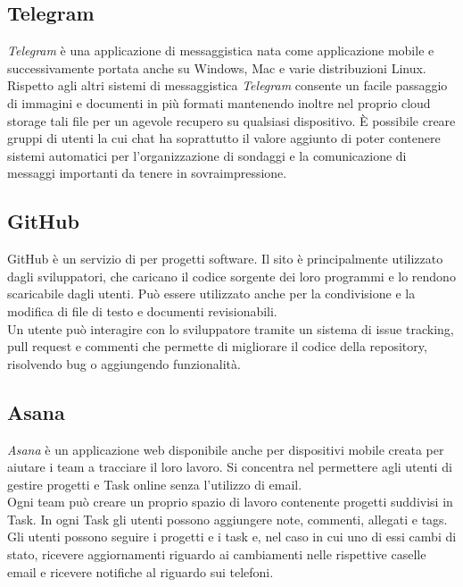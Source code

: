 \documentclass[./../NomeDocumento.tex]{subfiles}
\begin{document}
	\subsection{Telegram}
	
	\textit{Telegram} è una applicazione di messaggistica nata come applicazione mobile e successivamente portata anche su Windows, Mac e varie distribuzioni Linux. Rispetto agli altri sistemi di messaggistica \textit{Telegram} consente un facile passaggio di immagini e documenti in più formati mantenendo inoltre nel proprio cloud storage tali file per un agevole recupero su qualsiasi dispositivo. È possibile creare gruppi di utenti la cui chat ha soprattutto il valore aggiunto di poter contenere sistemi automatici per l'organizzazione di sondaggi e la comunicazione di messaggi importanti da tenere in sovraimpressione.
	
	\subsection{GitHub}
	
	GitHub è un servizio di  per progetti software. 
	Il sito è principalmente utilizzato dagli sviluppatori, che caricano il codice sorgente dei loro programmi e lo rendono scaricabile dagli utenti. Può essere utilizzato anche per la condivisione e la modifica di file di testo e documenti revisionabili.
	\\ \noindent Un utente può interagire con lo sviluppatore tramite un sistema di issue tracking, pull request e commenti che permette di migliorare il codice della repository, risolvendo bug o aggiungendo funzionalità.
	
	\subsection{Asana}
	
	\textit{Asana} è un applicazione web disponibile anche per dispositivi mobile creata per aiutare i team a tracciare il loro lavoro. Si concentra nel permettere agli utenti di gestire progetti e Task online senza l'utilizzo di email.
	\\ \noindent Ogni team può creare un proprio spazio di lavoro contenente progetti suddivisi in Task. In ogni Task gli utenti possono aggiungere note, commenti, allegati e tags. Gli utenti possono seguire i progetti e i task e, nel caso in cui uno di essi cambi di stato, ricevere aggiornamenti riguardo ai cambiamenti nelle rispettive caselle email e ricevere notifiche al riguardo sui telefoni.
	
\end{document}
